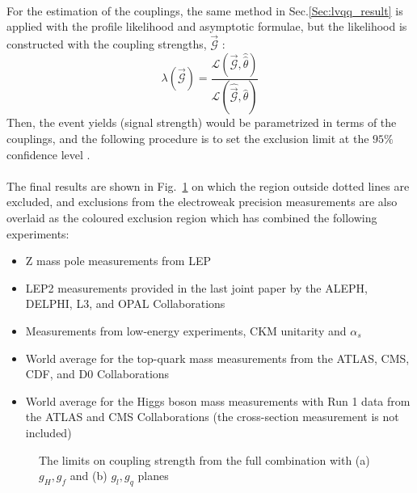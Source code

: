 \noindent
\\For the estimation of the couplings, the same method in Sec.\ref{Sec:lvqq_result} is applied with the profile likelihood and asymptotic formulae, but the likelihood is constructed with the coupling strengths, $\vec{\mathcal{G}}$ :
\begin{equation}
\lambda(\vec{\mathcal{G}}) = \frac{\mathcal{L}(\vec{\mathcal{G}},\hat{\hat{\theta}})}{\mathcal{L}(\hat{\vec{\mathcal{G}}},\hat{\theta})}
\end{equation}
Then, the event yields (signal strength) would be parametrized in terms of the couplings, and the following procedure is to set the exclusion limit at the $95\%$ confidence level .
\\
\\The final results are shown in Fig.~\ref{Fig:limit_coupling} on which the region outside dotted lines are excluded, and exclusions from the electroweak precision measurements \cite{delAguila:2010mx} are also overlaid as the coloured exclusion region which has combined the following experiments:
\begin{itemize}
	\item Z mass pole measurements from LEP\cite{delAguila:2010mx}
	\item LEP2 measurements provided in the last joint paper by the ALEPH, DELPHI, L3, and OPAL Collaborations\cite{Schael:2013ita}
	\item Measurements from low-energy experiments, CKM unitarity and $\alpha_{s}$\cite{Olive_2016}
	\item World average for the top-quark mass measurements from the ATLAS, CMS, CDF, and D0 Collaborations\cite{ATLAS:2014wva}
	\item World average for the Higgs boson mass measurements with Run 1 data from the ATLAS and CMS Collaborations (the cross-section measurement is not included)\cite{Aad:2015zhl}
\end{itemize}
\begin{figure}[ht]
	\centering
	\caption{The limits on coupling strength from the full combination with (a) {$g_H, g_f$} and (b) {$g_l, g_q$} planes }
	\label{Fig:limit_coupling}
\end{figure}
